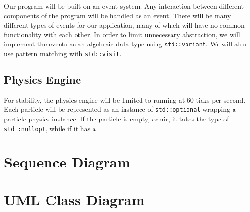 \documentclass[12pt]{article}
\begin{document}
    Our program will be built on an event system.
    Any interaction between different components of the program will be handled
    as an event.
    There will be many different types of events for our application, many of
    which will have no common functionality with each other.
    In order to limit unnecessary abstraction, we will implement the events as
    an algebraic data type using \verb|std::variant|.
    We will also use pattern matching with \verb|std::visit|.

    \subsection{Physics Engine}

    For stability, the physics engine will be limited to running at 60 ticks per
    second.
    Each particle will be represented as an instance of \verb|std::optional|
    wrapping a particle physics instance. If the particle is empty, or air, it
    takes the type of \verb|std::nullopt|, while if it has a 

    \section{Sequence Diagram}

    \section{UML Class Diagram}
    
\end{document}
